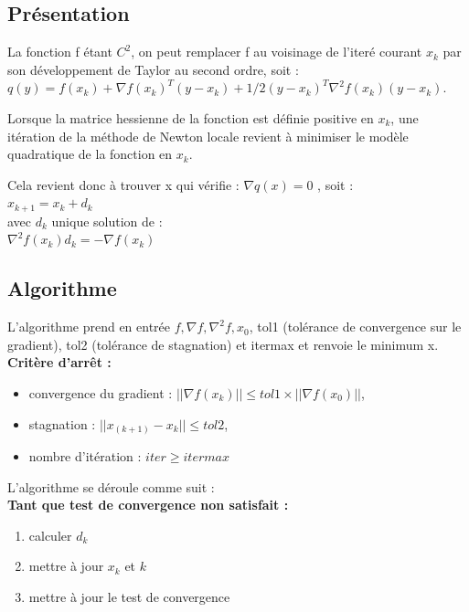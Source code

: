 \documentclass[a4paper,12pt]{article}
\theoremstyle{break}
\begin{document}
\subsection{Présentation}

La fonction f étant $C^2$, on peut remplacer f au voisinage de l’iteré courant $x_k$ par son
développement de Taylor au second ordre, soit :\\
$q(y) = f(x_k) + \nabla f(x_k)^T (y-x_k) + 1/2 (y-x_k)^T \nabla^2 f(x_k) (y-x_k)$.

Lorsque la matrice hessienne de la fonction est définie positive en $x_k$, une itération de la méthode de Newton locale revient à minimiser le modèle quadratique de la fonction en $x_k$.

Cela revient donc à trouver x qui vérifie : $\nabla q(x) = 0$ , soit :\\
$x_{k+1} = x_k + d_k$\\
avec $d_k$ unique solution de : \\
$\nabla^2 f(x_k)d_k = - \nabla f(x_k)$


\subsection{Algorithme}

L'algorithme prend en entrée $f, \nabla f, \nabla^2 f, x_0$, tol1 (tolérance de convergence sur le gradient), tol2 (tolérance de stagnation) et itermax et renvoie le minimum x.\\

\textbf{Critère d'arrêt : }
\begin{itemize}
\item convergence du gradient : $||\nabla f(x_k)|| \leq tol1 \times ||\nabla f(x_0)||$,
\item stagnation : $||x_(k+1) - x_k||  \leq tol2$,
\item nombre d'itération : $iter \geq itermax$\\
\end{itemize}

L'algorithme se déroule comme suit :\\
\textbf{Tant que test de convergence non satisfait :}
\begin{enumerate}
	\item calculer $d_k$
	\item mettre à jour $x_k$ et $k$
	\item mettre à jour le test de convergence
\end{enumerate}
\end{document}
